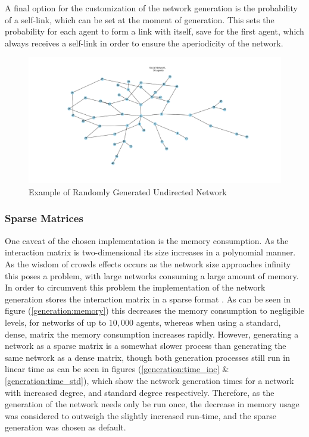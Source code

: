 \documentclass{article}
\begin{document}
A final option for the customization of the network generation is the probability of a self-link, which can be set at the moment of generation. This sets the probability for each agent to form a link with itself, save for the first agent, which always receives a self-link in order to ensure the aperiodicity of the network.
\begin{center}
    \begin{figure}[!htbp]
        \centering
        \includegraphics[width=1.1\textwidth]{ThesisKI/Images/NoneGraphRandom.png}
        \caption{Example of Randomly Generated Undirected Network}
        \label{network:random}
    \end{figure}
\end{center}

\newpage

\subsubsection{Sparse Matrices}

One caveat of the chosen implementation is the memory consumption. As the interaction matrix is two-dimensional its size increases in a polynomial manner. As the wisdom of crowds effects occurs as the network size approaches infinity this poses a problem, with large networks consuming a large amount of memory. In order to circumvent this problem the implementation of the network generation stores the interaction matrix in a sparse format \cite{2020SciPy-NMeth}. As can be seen in figure (\ref{generation:memory}) this decreases the memory consumption to negligible levels, for networks of up to $10,000$ agents, whereas when using a standard, dense, matrix the memory consumption increases rapidly. \newline
However, generating a network as a sparse matrix is a somewhat slower process than generating the same network as a dense matrix, though both generation processes still run in linear time as can be seen in figures (\ref{generation:time_inc} \& \ref{generation:time_std}),  which show the network generation times for a network with increased degree, and standard degree respectively. Therefore, as the generation of the network needs only be run once, the decrease in memory usage was considered to outweigh the slightly increased run-time, and the sparse generation was chosen as default.
\end{document}
